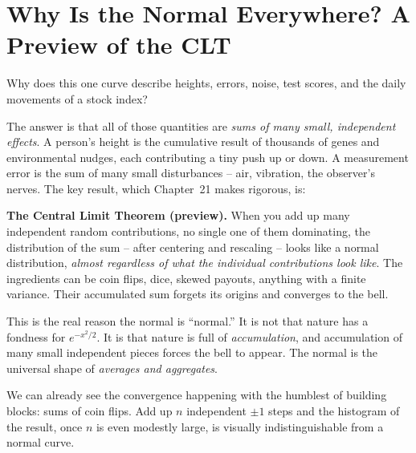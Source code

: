 \section{Why Is the Normal Everywhere? A Preview of the CLT}
\label{ch12:everywhere}

Why does this one curve describe heights, errors, noise, test scores, and the daily movements of a stock index?

The answer is that all of those quantities are \emph{sums of many small,
independent effects}. A person's height is the cumulative result of thousands of
genes and environmental nudges, each contributing a tiny push up or down. A
measurement error is the sum of many small disturbances -- air, vibration, the
observer's nerves. The key result, which Chapter~21 makes rigorous, is:

\begin{aestheticbox}
\textbf{The Central Limit Theorem (preview).} When you add up many independent
random contributions, no single one of them dominating, the distribution of the
sum -- after centering and rescaling -- looks like a normal distribution,
\emph{almost regardless of what the individual contributions look like}. The
ingredients can be coin flips, dice, skewed payouts, anything with a finite
variance. Their accumulated sum forgets its origins and converges to the bell.
\end{aestheticbox}

This is the real reason the normal is ``normal.'' It is not that nature has a
fondness for $e^{-x^2/2}$. It is that nature is full of \emph{accumulation}, and
accumulation of many small independent pieces forces the bell to appear. The
normal is the universal shape of \emph{averages and aggregates}.

We can already see the convergence happening with the humblest of building blocks:
sums of coin flips. Add up $n$ independent $\pm 1$ steps and the histogram of the
result, once $n$ is even modestly large, is visually indistinguishable from a
normal curve.


